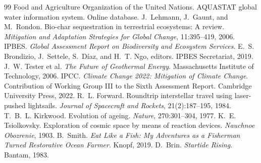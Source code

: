 \begin{thebibliography}{99}
 Food and Agriculture Organization of the United Nations. AQUASTAT global water information system. Online database.
 J.~Lehmann, J.~Gaunt, and M.~Rondon. Bio-char sequestration in terrestrial ecosystems: A review. \emph{Mitigation and Adaptation Strategies for Global Change}, 11:395--419, 2006.
 IPBES. \emph{Global Assessment Report on Biodiversity and Ecosystem Services}. E.~S. Brondizio, J.~Settele, S.~D\'iaz, and H.~T. Ngo, editors. IPBES Secretariat, 2019.
 J.~W. Tester et al. \emph{The Future of Geothermal Energy}. Massachusetts Institute of Technology, 2006.
 IPCC. \emph{Climate Change 2022: Mitigation of Climate Change}. Contribution of Working Group III to the Sixth Assessment Report. Cambridge University Press, 2022.
 R.~L. Forward. Roundtrip interstellar travel using laser-pushed lightsails. \emph{Journal of Spacecraft and Rockets}, 21(2):187--195, 1984.
 T.~B.~L. Kirkwood. Evolution of ageing. \emph{Nature}, 270:301--304, 1977.
 K.~E. Tsiolkovsky. Exploration of cosmic space by means of reaction devices. \emph{Nauchnoe Obozrenie}, 1903.
 B.~Smith. \emph{Eat Like a Fish: My Adventures as a Fisherman Turned Restorative Ocean Farmer}. Knopf, 2019.
 D.~Brin. \emph{Startide Rising}. Bantam, 1983.
\end{thebibliography}
